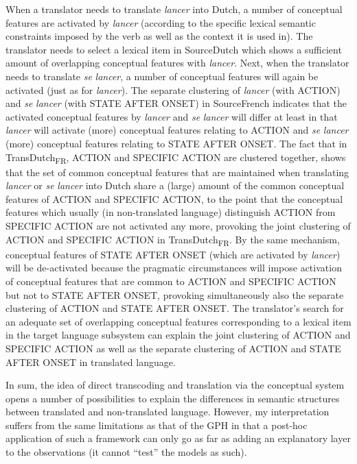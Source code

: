 When a translator needs to translate \textit{lancer} into Dutch, a number of conceptual features are activated by \textit{lancer} (according to the specific lexical semantic constraints imposed by the verb as well as the context it is used in). The translator needs to select a lexical item in SourceDutch which shows a sufficient amount of overlapping conceptual features with \textit{lancer}. Next, when the translator needs to translate \textit{se} \textit{lancer}, a number of conceptual features will again be activated (just as for \textit{lancer}). The separate clustering of \textit{lancer} (with ACTION) and \textit{se} \textit{lancer} (with STATE AFTER ONSET) in SourceFrench indicates that the activated conceptual features by \textit{lancer} and \textit{se} \textit{lancer} will differ at least in that \textit{lancer} will activate (more) conceptual features relating to ACTION and \textit{se} \textit{lancer} (more) conceptual features relating to STATE AFTER ONSET. The fact that in TransDutch\textsubscript{FR}, ACTION and SPECIFIC ACTION are clustered together, shows that the set of common conceptual features that are maintained when translating \textit{lancer} or \textit{se} \textit{lancer} into Dutch share a (large) amount of the common conceptual features of ACTION and SPECIFIC ACTION, to the point that the conceptual features which usually (in non-translated language) distinguish ACTION from SPECIFIC ACTION are not activated any more, provoking the joint clustering of ACTION and SPECIFIC ACTION in TransDutch\textsubscript{FR}. By the same mechanism, conceptual features of STATE AFTER ONSET (which are activated by \textit{lancer}) will be de-activated because the pragmatic circumstances will impose activation of conceptual features that are common to ACTION and SPECIFIC ACTION but not to STATE AFTER ONSET, provoking simultaneously also the separate clustering of ACTION and STATE AFTER ONSET. The translator’s search for an adequate set of overlapping conceptual features corresponding to a lexical item in the target language subsystem can explain the joint clustering of ACTION and SPECIFIC ACTION as well as the separate clustering of ACTION and STATE AFTER ONSET in translated language.

In sum, the idea of direct transcoding and translation via the conceptual system opens a number of possibilities to explain the differences in semantic structures between translated and non-translated language. However, my interpretation suffers from the same limitations as that of the GPH in that a post-hoc application of such a framework can only go as far as adding an explanatory layer to the observations (it cannot ``test'' the models as such).

